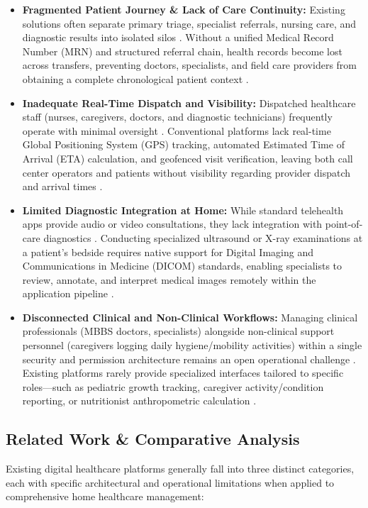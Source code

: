 \documentclass[lettersize,onecolumn,journal]{IEEEtran}
\begin{document}
	\begin{itemize}
		\item \textbf{Fragmented Patient Journey \& Lack of Care Continuity:} Existing solutions often separate primary triage, specialist referrals, nursing care, and diagnostic results into isolated silos \cite{srs2026}. Without a unified Medical Record Number (MRN) and structured referral chain, health records become lost across transfers, preventing doctors, specialists, and field care providers from obtaining a complete chronological patient context \cite{srs2026}.
		\item \textbf{Inadequate Real-Time Dispatch and Visibility:} Dispatched healthcare staff (nurses, caregivers, doctors, and diagnostic technicians) frequently operate with minimal oversight \cite{zandbergen2009accuracy}. Conventional platforms lack real-time Global Positioning System (GPS) tracking, automated Estimated Time of Arrival (ETA) calculation, and geofenced visit verification, leaving both call center operators and patients without visibility regarding provider dispatch and arrival times \cite{zandbergen2009accuracy, osrm_routing}.
		\item \textbf{Limited Diagnostic Integration at Home:} While standard telehealth apps provide audio or video consultations, they lack integration with point-of-care diagnostics \cite{pacs2001}. Conducting specialized ultrasound or X-ray examinations at a patient’s bedside requires native support for Digital Imaging and Communications in Medicine (DICOM) standards, enabling specialists to review, annotate, and interpret medical images remotely within the application pipeline \cite{dicom2021, cornerstone3d}.
		\item \textbf{Disconnected Clinical and Non-Clinical Workflows:} Managing clinical professionals (MBBS doctors, specialists) alongside non-clinical support personnel (caregivers logging daily hygiene/mobility activities) within a single security and permission architecture remains an open operational challenge \cite{rbac_standard}. Existing platforms rarely provide specialized interfaces tailored to specific roles—such as pediatric growth tracking, caregiver activity/condition reporting, or nutritionist anthropometric calculation \cite{who_child_growth}.
	\end{itemize}
	
	\subsection{Related Work \& Comparative Analysis}
	Existing digital healthcare platforms generally fall into three distinct categories, each with specific architectural and operational limitations when applied to comprehensive home healthcare management:
	
\end{document}
